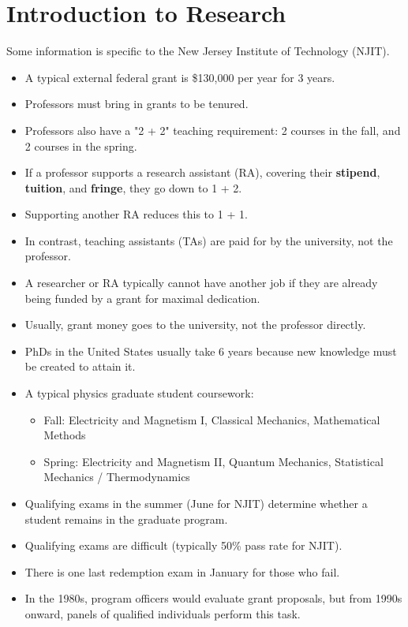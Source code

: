 \section {Introduction to Research}

Some information is specific to the New Jersey Institute of Technology (NJIT).

\begin{itemize}
    \item A typical external federal grant is \$130,000 per year for 3 years.
    \item Professors must bring in grants to be tenured.
    \item Professors also have a "2 + 2" teaching requirement: 2 courses in the fall, and 2 courses in the spring.
    \item If a professor supports a research assistant (RA), covering their \textbf{stipend}, \textbf{tuition}, and \textbf{fringe}, they go down to 1 + 2.
    \item Supporting another RA reduces this to 1 + 1.
    \item In contrast, teaching assistants (TAs) are paid for by the university, not the professor.
    \item A researcher or RA typically cannot have another job if they are already being funded by a grant for maximal dedication.
    \item Usually, grant money goes to the university, not the professor directly.
    \item PhDs in the United States usually take 6 years because new knowledge must be created to attain it.
    \item A typical physics graduate student coursework:
          \begin{itemize}
              \item Fall: Electricity and Magnetism I, Classical Mechanics, Mathematical Methods
              \item Spring: Electricity and Magnetism II, Quantum Mechanics, Statistical Mechanics / Thermodynamics
          \end{itemize}
    \item Qualifying exams in the summer (June for NJIT) determine whether a student remains in the graduate program.
    \item Qualifying exams are difficult (typically 50\% pass rate for NJIT).
    \item There is one last redemption exam in January for those who fail.
    \item In the 1980s, program officers would evaluate grant proposals, but from 1990s onward, panels of qualified individuals perform this task.
\end{itemize}

